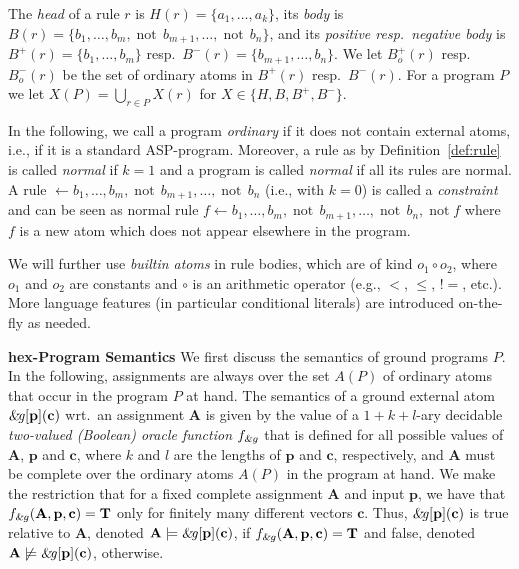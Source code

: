 \documentclass[11pt,fleqn,twoside]{article}
\newcommand{\leanparagraph}[1]{\smallskip\noindent\textbf{#1}}
\renewcommand{\vec}[1]{\ensuremath{\mb{#1}}}
\newcommand{\mb}[1]{\ensuremath{\mathbf{#1}}}
\def\naf{\ensuremath{\mathop{not}}}
\newcommand\hex{{\sc hex}\xspace}
\newcommand{\amp}[1]{\ensuremath{\text{\textsl{{\&}}}\!\mathit{#1}}}
\newcommand{\ext}[3]{\ensuremath{\amp{#1}[#2](#3)}}
\newcommand{\extfun}[1]{\ensuremath{f_{\text{\sl\&}#1}}}
\newcommand{\extsem}[4]{\ensuremath{f_{\text{\sl\&}#1}(#2,#3,#4)}}
\newcommand{\T}{\mathbf{T}}
\newcommand{\Assignment}{\ensuremath{\mathbf{A}}}
\newcommand{\Program}{\ensuremath{P}}
\begin{document}
		\noindent The \emph{head} of a rule $r$ is $H(r) = \{ a_1, \ldots, a_k \}$,
		its \emph{body} is $B(r) = \{b_1, \dotsc, b_m,\naf\, b_{m+1}, \dotsc, \naf\, b_n\}$,
		and its \emph{positive resp.~negative body} is $B^{+}(r) = \{ b_1, \ldots, b_m \}$ resp.~$B^{-}(r) = \{ b_{m+1}, \ldots, b_n \}$.
		We let $B^{+}_o(r)$ resp.~$B^{-}_o(r)$ be the set of ordinary atoms in $B^{+}(r)$ resp.~$B^{-}(r)$.
		For a program $\Program$ we let $X(P) = \bigcup_{r \in P} X(r)$ for $X \in \{ H, B, B^{+}, B^{-} \}$.

		In the following, we call a program \emph{ordinary} if it does not contain external atoms,
		i.e., if it is a standard ASP-program.
		Moreover, a rule as by Definition~\ref{def:rule} is called \emph{normal} if $k = 1$
		and a program is called \emph{normal} if all its rules are normal.
		A rule $\leftarrow b_1,\dotsc, b_m, \naf\, b_{m+1}, \dotsc, \naf\, b_n$ (i.e., with $k = 0$)
		is called a \emph{constraint} and can be seen as normal rule $f \leftarrow b_1,\dotsc, b_m, \naf\, b_{m+1}, \dotsc, \naf\, b_n, \naf f$
		where $f$ is a new atom which does not appear elsewhere in the program.

		We will further use \emph{builtin atoms} in rule bodies,
		which are of kind $o_1 \circ o_2$, where $o_1$ and $o_2$ are constants and $\circ$ is an arithmetic operator (e.g., $<$, $\le$, $!=$, etc.).
		More language features (in particular conditional literals) are introduced on-the-fly as needed.
		
		\leanparagraph{\hex-Program Semantics}
		We first discuss the semantics of ground programs $\Program$.
		In the following, assignments are always over the set $A(P)$ of ordinary atoms 
		that occur in the program $\Program$ at hand.
		The semantics of a ground external atom $\ext{g}{\vec{p}}{\vec{c}}$
		wrt.~an assignment $\Assignment$ is given by the value of a $1{+}k{+}l$-ary decidable
		\emph{two-valued (Boolean) oracle function} $\extfun{g}$ that is defined for all possible values
		of $\Assignment$, $\vec{p}$ and $\vec{c}$, where $k$ and $l$ are the lengths of $\vec{p}$ and $\vec{c}$,
		respectively, and $\Assignment$ must be complete over the ordinary atoms $A(P)$ in the program at hand.
		We make the restriction that for a fixed complete assignment $\Assignment$ and input $\vec{p}$,
		we have that $\extsem{g}{\Assignment}{\vec{p}}{\vec{c}} = \T$ only for finitely many different vectors $\vec{c}$.
		Thus,
		$\ext{g}{\vec{p}}{\vec{c}}$ is true relative
		to $\Assignment$, denoted $\Assignment \models \ext{g}{\vec{p}}{\vec{c}}$, if
		$\extsem{g}{\Assignment}{\vec{p}}{\vec{c}} = \T$ and false,
		denoted $\Assignment \not\models \ext{g}{\vec{p}}{\vec{c}}$,
		otherwise.
		
\end{document}
